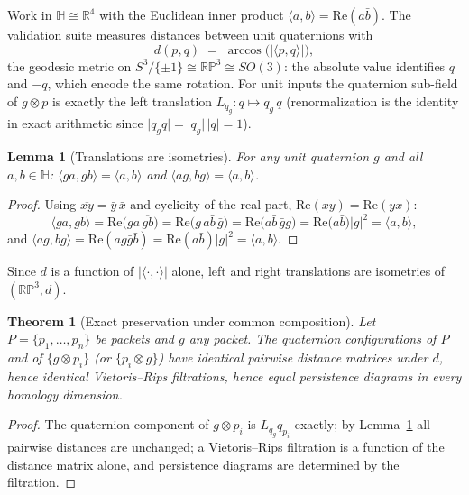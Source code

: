 \documentclass[11pt]{article}
\newtheorem{theorem}{Theorem}
\newtheorem{lemma}{Lemma}
\begin{document}
Work in $\mathbb{H} \cong \mathbb{R}^4$ with the Euclidean inner product
$\langle a, b\rangle = \mathrm{Re}(a\bar b)$. The validation suite measures
distances between unit quaternions with
\[
d(p, q) \;=\; \arccos\bigl(\lvert\langle p, q\rangle\rvert\bigr),
\]
the geodesic metric on $S^3/\{\pm 1\} \cong \mathbb{RP}^3 \cong SO(3)$: the
absolute value identifies $q$ and $-q$, which encode the same rotation. For
unit inputs the quaternion sub-field of $g \otimes p$ is exactly the left
translation $L_{q_g}: q \mapsto q_g\, q$ (renormalization is the identity
in exact arithmetic since $\lvert q_g q\rvert = \lvert q_g\rvert\,\lvert
q\rvert = 1$).

\begin{lemma}[Translations are isometries]\label{lem:iso}
For any unit quaternion $g$ and all $a, b \in \mathbb{H}$:
$\langle ga, gb\rangle = \langle a, b\rangle$ and
$\langle ag, bg\rangle = \langle a, b\rangle$.
\end{lemma}

\begin{proof}
Using $\overline{xy} = \bar y\,\bar x$ and cyclicity of the real part,
$\mathrm{Re}(xy) = \mathrm{Re}(yx)$:
\[
\langle ga, gb\rangle
  = \mathrm{Re}\bigl(ga\,\overline{gb}\bigr)
  = \mathrm{Re}\bigl(g\,a\bar b\,\bar g\bigr)
  = \mathrm{Re}\bigl(a\bar b\,\bar g g\bigr)
  = \mathrm{Re}\bigl(a\bar b\bigr)\lvert g\rvert^2
  = \langle a, b\rangle,
\]
and $\langle ag, bg\rangle = \mathrm{Re}(ag\bar g\bar b) =
\mathrm{Re}(a\bar b)\lvert g\rvert^2 = \langle a, b\rangle$.
\end{proof}

Since $d$ is a function of $\lvert\langle\cdot,\cdot\rangle\rvert$ alone,
left and right translations are isometries of $(\mathbb{RP}^3, d)$.

\begin{theorem}[Exact preservation under common composition]\label{thm:exact}
Let $P = \{p_1, \dots, p_n\}$ be packets and $g$ any packet. The quaternion
configurations of $P$ and of $\{g \otimes p_i\}$ (or $\{p_i \otimes g\}$)
have identical pairwise distance matrices under $d$, hence identical
Vietoris--Rips filtrations, hence equal persistence diagrams in every
homology dimension.
\end{theorem}

\begin{proof}
The quaternion component of $g \otimes p_i$ is $L_{q_g} q_{p_i}$ exactly;
by Lemma~\ref{lem:iso} all pairwise distances are unchanged; a
Vietoris--Rips filtration is a function of the distance matrix alone, and
persistence diagrams are determined by the filtration.
\end{proof}
\end{document}
